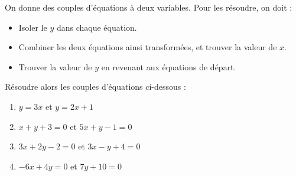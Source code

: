 \documentclass{automatisme}
\begin{document}
\begin{frame}
	On donne des couples d'équations à deux variables. Pour les résoudre, on doit :
	\begin{itemize}
		\item Isoler le $y$ dans chaque équation.
		\item Combiner les deux équations ainsi transformées, et trouver la valeur de $x$.
		\item Trouver la valeur de $y$ en revenant aux équations de départ.
	\end{itemize}

	Résoudre alors les couples d'équations ci-dessous :

	\begin{enumerate}
		\item $y = 3x$ \hspace{3.85em} et $y = 2x + 1$
		\item $x + y + 3 = 0$ \hspace{0.8em} et $5x + y - 1 = 0$
		\item $3x + 2y - 2 = 0$ et $3x - y + 4 = 0$
		\item $-6x + 4y = 0$ \hspace{0.75em} et $7y + 10 = 0$
	\end{enumerate}
\end{frame}
\end{document}
